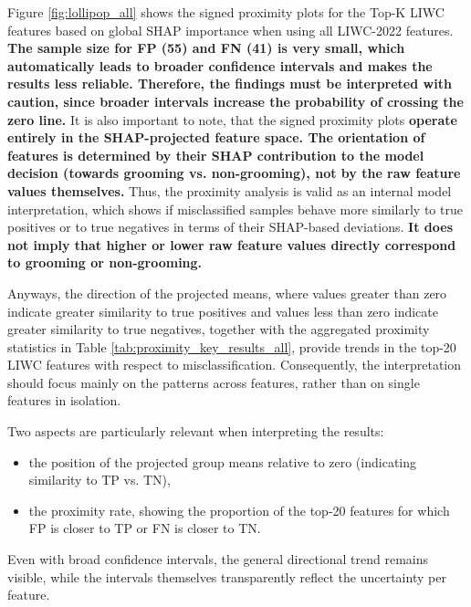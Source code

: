 Figure \ref{fig:lollipop_all} shows the signed proximity plots for the Top-K LIWC features based on global SHAP importance when using all LIWC-2022 features. \textbf{The sample size for FP (55) and FN (41) is very small, which automatically leads to broader confidence intervals and makes the results less reliable. Therefore, the findings must be interpreted with caution, since broader intervals increase the probability of crossing the zero line.} It is also important to note, that the signed proximity plots \textbf{operate entirely in the SHAP-projected feature space. The orientation of features is determined by their SHAP contribution to the model decision (towards grooming vs. non-grooming), not by the raw feature values themselves.} Thus, the proximity analysis is valid as an internal model interpretation, which shows if misclassified samples behave more similarly to true positives or to true negatives in terms of their SHAP-based deviations. \textbf{It does not imply that higher or lower raw feature values directly correspond to grooming or non-grooming.}

Anyways, the direction of the projected means, where values greater than zero indicate greater similarity to true positives and values less than zero indicate greater similarity to true negatives, together with the aggregated proximity statistics in Table \ref{tab:proximity_key_results_all}, provide trends in the top-20 LIWC features with respect to misclassification. Consequently, the interpretation should focus mainly on the patterns across features, rather than on single features in isolation.

Two aspects are particularly relevant when interpreting the results:
\begin{itemize}
\item the position of the projected group means relative to zero (indicating similarity to TP vs. TN),
\item the proximity rate, showing the proportion of the top-20 features for which FP is closer to TP or FN is closer to TN.
\end{itemize}

Even with broad confidence intervals, the general directional trend remains visible, while the intervals themselves transparently reflect the uncertainty per feature.

